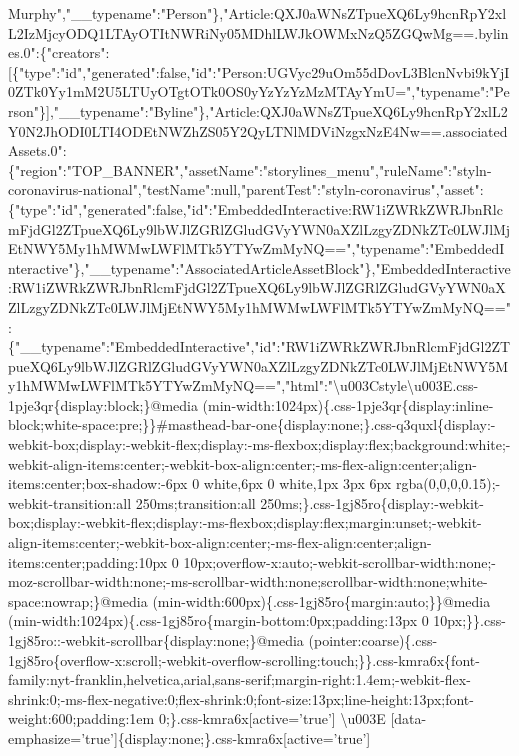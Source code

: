 Murphy","\_\_typename":"Person"\},"Article:QXJ0aWNsZTpueXQ6Ly9hcnRpY2xlL2IzMjcyODQ1LTAyOTItNWRiNy05MDhlLWJkOWMxNzQ5ZGQwMg==.bylines.0":\{"creators":{[}\{"type":"id","generated":false,"id":"Person:UGVyc29uOm55dDovL3BlcnNvbi9kYjI0ZTk0Yy1mM2U5LTUyOTgtOTk0OS0yYzYzYzMzMTAyYmU=","typename":"Person"\}{]},"\_\_typename":"Byline"\},"Article:QXJ0aWNsZTpueXQ6Ly9hcnRpY2xlL2Y0N2JhODI0LTI4ODEtNWZhZS05Y2QyLTNlMDViNzgxNzE4Nw==.associatedAssets.0":\{"region":"TOP\_BANNER","assetName":"storylines\_menu","ruleName":"styln-coronavirus-national","testName":null,"parentTest":"styln-coronavirus","asset":\{"type":"id","generated":false,"id":"EmbeddedInteractive:RW1iZWRkZWRJbnRlcmFjdGl2ZTpueXQ6Ly9lbWJlZGRlZGludGVyYWN0aXZlLzgyZDNkZTc0LWJlMjEtNWY5My1hMWMwLWFlMTk5YTYwZmMyNQ==","typename":"EmbeddedInteractive"\},"\_\_typename":"AssociatedArticleAssetBlock"\},"EmbeddedInteractive:RW1iZWRkZWRJbnRlcmFjdGl2ZTpueXQ6Ly9lbWJlZGRlZGludGVyYWN0aXZlLzgyZDNkZTc0LWJlMjEtNWY5My1hMWMwLWFlMTk5YTYwZmMyNQ==":\{"\_\_typename":"EmbeddedInteractive","id":"RW1iZWRkZWRJbnRlcmFjdGl2ZTpueXQ6Ly9lbWJlZGRlZGludGVyYWN0aXZlLzgyZDNkZTc0LWJlMjEtNWY5My1hMWMwLWFlMTk5YTYwZmMyNQ==","html":"\textbackslash{}u003Cstyle\textbackslash{}u003E.css-1pje3qr\{display:block;\}@media
(min-width:1024px)\{.css-1pje3qr\{display:inline-block;white-space:pre;\}\}\#masthead-bar-one\{display:none;\}.css-q3quxl\{display:-webkit-box;display:-webkit-flex;display:-ms-flexbox;display:flex;background:white;-webkit-align-items:center;-webkit-box-align:center;-ms-flex-align:center;align-items:center;box-shadow:-6px
0 white,6px 0 white,1px 3px 6px rgba(0,0,0,0.15);-webkit-transition:all
250ms;transition:all
250ms;\}.css-1gj85ro\{display:-webkit-box;display:-webkit-flex;display:-ms-flexbox;display:flex;margin:unset;-webkit-align-items:center;-webkit-box-align:center;-ms-flex-align:center;align-items:center;padding:10px
0
10px;overflow-x:auto;-webkit-scrollbar-width:none;-moz-scrollbar-width:none;-ms-scrollbar-width:none;scrollbar-width:none;white-space:nowrap;\}@media
(min-width:600px)\{.css-1gj85ro\{margin:auto;\}\}@media
(min-width:1024px)\{.css-1gj85ro\{margin-bottom:0px;padding:13px 0
10px;\}\}.css-1gj85ro::-webkit-scrollbar\{display:none;\}@media
(pointer:coarse)\{.css-1gj85ro\{overflow-x:scroll;-webkit-overflow-scrolling:touch;\}\}.css-kmra6x\{font-family:nyt-franklin,helvetica,arial,sans-serif;margin-right:1.4em;-webkit-flex-shrink:0;-ms-flex-negative:0;flex-shrink:0;font-size:13px;line-height:13px;font-weight:600;padding:1em
0;\}.css-kmra6x{[}active='true'{]} \textbackslash{}u003E
{[}data-emphasize='true'{]}\{display:none;\}.css-kmra6x{[}active='true'{]}
